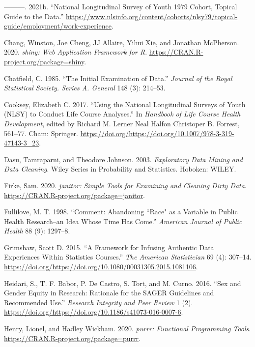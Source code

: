 \documentclass[12pt]{article}
\begin{document}
\leavevmode\hypertarget{ref-nlsy79guide}{}%
---------. 2021b. ``National Longitudinal Survey of Youth 1979 Cohort, Topical Guide to the Data.'' \url{https://www.nlsinfo.org/content/cohorts/nlsy79/topical-guide/employment/work-experience}.

\leavevmode\hypertarget{ref-shiny}{}%
Chang, Winston, Joe Cheng, JJ Allaire, Yihui Xie, and Jonathan McPherson. 2020. \emph{shiny: Web Application Framework for R}. \url{https://CRAN.R-project.org/package=shiny}.

\leavevmode\hypertarget{ref-Chatfield1985TIEo}{}%
Chatfield, C. 1985. ``The Initial Examination of Data.'' \emph{Journal of the Royal Statistical Society. Series A. General} 148 (3): 214--53.

\leavevmode\hypertarget{ref-eliznlsy}{}%
Cooksey, Elizabeth C. 2017. ``Using the National Longitudinal Surveys of Youth (NLSY) to Conduct Life Course Analyses.'' In \emph{Handbook of Life Course Health Development}, edited by Richard M. Lerner Neal Halfon Christoper B. Forrest, 561--77. Cham: Springer. \url{https://doi.org/https://doi.org/10.1007/978-3-319-47143-3_23}.

\leavevmode\hypertarget{ref-DasuTamraparni2003Edma}{}%
Dasu, Tamraparni, and Theodore Johnson. 2003. \emph{Exploratory Data Mining and Data Cleaning}. Wiley Series in Probability and Statistics. Hoboken: WILEY.

\leavevmode\hypertarget{ref-janitor}{}%
Firke, Sam. 2020. \emph{janitor: Simple Tools for Examining and Cleaning Dirty Data}. \url{https://CRAN.R-project.org/package=janitor}.

\leavevmode\hypertarget{ref-racismnotrace}{}%
Fullilove, M. T. 1998. ``Comment: Abandoning ``Race" as a Variable in Public Health Research--an Idea Whose Time Has Come.'' \emph{American Journal of Public Health} 88 (9): 1297--8.

\leavevmode\hypertarget{ref-grimshaw}{}%
Grimshaw, Scott D. 2015. ``A Framework for Infusing Authentic Data Experiences Within Statistics Courses.'' \emph{The American Statistician} 69 (4): 307--14. \url{https://doi.org/https://doi.org/10.1080/00031305.2015.1081106}.

\leavevmode\hypertarget{ref-SAGER}{}%
Heidari, S., T. F. Babor, P. De Castro, S. Tort, and M. Curno. 2016. ``Sex and Gender Equity in Research: Rationale for the SAGER Guidelines and Recommended Use.'' \emph{Research Integrity and Peer Review} 1 (2). \url{https://doi.org/https://doi.org/10.1186/s41073-016-0007-6}.

\leavevmode\hypertarget{ref-purrr}{}%
Henry, Lionel, and Hadley Wickham. 2020. \emph{purrr: Functional Programming Tools}. \url{https://CRAN.R-project.org/package=purrr}.
\end{document}
